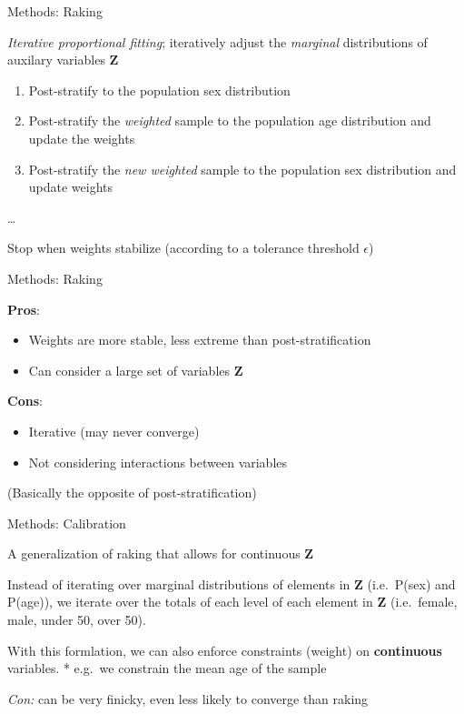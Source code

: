 \documentclass[
  ignorenonframetext,
]{beamer}
\providecommand{\tightlist}{%
  \setlength{\itemsep}{0pt}\setlength{\parskip}{0pt}}
\begin{document}
\begin{frame}{Methods: Raking}
\protect\hypertarget{methods-raking}{}

\emph{Iterative proportional fitting}; iteratively adjust the
\emph{marginal} distributions of auxilary variables \(\mathbf{Z}\)

\begin{enumerate}
\item
  Post-stratify to the population sex distribution
\item
  Post-stratify the \emph{weighted} sample to the population age
  distribution and update the weights
\item
  Post-stratify the \emph{new weighted} sample to the population sex
  distribution and update weights
\end{enumerate}

\ldots{}

Stop when weights stabilize (according to a tolerance threshold
\(\epsilon\))

\end{frame}

\begin{frame}{Methods: Raking}
\protect\hypertarget{methods-raking-1}{}

\textbf{Pros}:

\begin{itemize}
\tightlist
\item
  Weights are more stable, less extreme than post-stratification
\item
  Can consider a large set of variables \(\mathbf{Z}\)
\end{itemize}

\textbf{Cons}:

\begin{itemize}
\tightlist
\item
  Iterative (may never converge)
\item
  Not considering interactions between variables
\end{itemize}

(Basically the opposite of post-stratification)

\end{frame}

\begin{frame}{Methods: Calibration}
\protect\hypertarget{methods-calibration}{}

A generalization of raking that allows for continuous \(\mathbf{Z}\)

Instead of iterating over marginal distributions of elements in
\(\mathbf{Z}\) (i.e.~P(sex) and P(age)), we iterate over the totals of
each level of each element in \(\mathbf{Z}\) (i.e.~female, male, under
50, over 50).

With this formlation, we can also enforce constraints (weight) on
\textbf{continuous} variables. * e.g.~we constrain the mean age of the
sample

\emph{Con:} can be very finicky, even less likely to converge than
raking

\end{frame}
\end{document}

